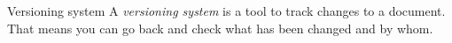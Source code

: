 \begin{definition}{Versioning system} A \textit{versioning system} is a tool to track changes to a document. That means you can go back and check what has been changed and by whom.\end{definition}